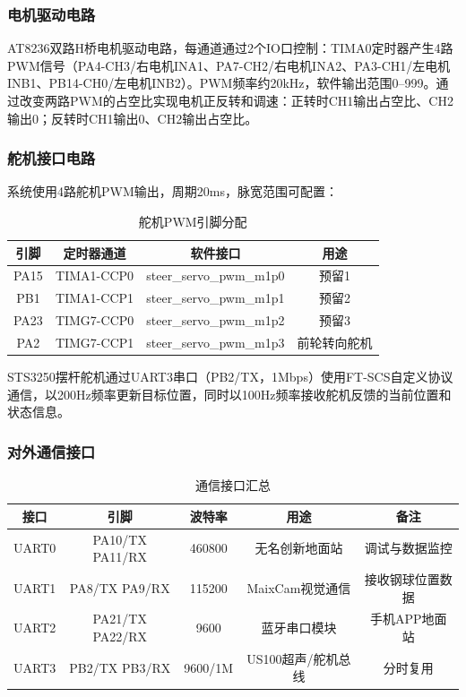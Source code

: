 \documentclass[12pt,a4paper]{ctexart}
\begin{document}
\subsubsection{电机驱动电路}

AT8236双路H桥电机驱动电路，每通道通过2个IO口控制：TIMA0定时器产生4路PWM信号（PA4-CH3/右电机INA1、PA7-CH2/右电机INA2、PA3-CH1/左电机INB1、PB14-CH0/左电机INB2）。PWM频率约20kHz，软件输出范围0--999。通过改变两路PWM的占空比实现电机正反转和调速：正转时CH1输出占空比、CH2输出0；反转时CH1输出0、CH2输出占空比。

\subsubsection{舵机接口电路}

系统使用4路舵机PWM输出，周期20ms，脉宽范围可配置：

\begin{table}[H]
    \centering
    \footnotesize
    \caption{舵机PWM引脚分配}
    \label{tab:servo_pins}
    \begin{tabular}{|c|c|c|c|}
        \hline
        引脚 & 定时器通道 & 软件接口 & 用途 \\
        \hline
        PA15 & TIMA1-CCP0 & steer\_servo\_pwm\_m1p0 & 预留1 \\
        \hline
        PB1 & TIMA1-CCP1 & steer\_servo\_pwm\_m1p1 & 预留2 \\
        \hline
        PA23 & TIMG7-CCP0 & steer\_servo\_pwm\_m1p2 & 预留3 \\
        \hline
        PA2 & TIMG7-CCP1 & steer\_servo\_pwm\_m1p3 & 前轮转向舵机 \\
        \hline
    \end{tabular}
\end{table}

STS3250摆杆舵机通过UART3串口（PB2/TX，1Mbps）使用FT-SCS自定义协议通信，以200Hz频率更新目标位置，同时以100Hz频率接收舵机反馈的当前位置和状态信息。

\subsubsection{对外通信接口}

\begin{table}[H]
    \centering
    \footnotesize
    \caption{通信接口汇总}
    \label{tab:comm_interfaces}
    \begin{tabular}{|c|c|c|c|c|}
        \hline
        接口 & 引脚 & 波特率 & 用途 & 备注 \\
        \hline
        UART0 & PA10/TX PA11/RX & 460800 & 无名创新地面站 & 调试与数据监控 \\
        \hline
        UART1 & PA8/TX PA9/RX & 115200 & MaixCam视觉通信 & 接收钢球位置数据 \\
        \hline
        UART2 & PA21/TX PA22/RX & 9600 & 蓝牙串口模块 & 手机APP地面站 \\
        \hline
        UART3 & PB2/TX PB3/RX & 9600/1M & US100超声/舵机总线 & 分时复用 \\
        \hline
    \end{tabular}
\end{table}
\end{document}
